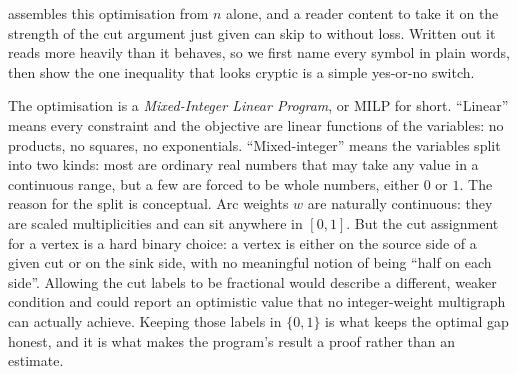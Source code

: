 assembles this optimisation from $n$ alone, and a reader content to take it on the strength of the cut argument just given can skip to  without loss. Written out it reads more heavily than it behaves, so we first name every symbol in plain words, then show the one inequality that looks cryptic is a simple yes-or-no switch.

The optimisation is a \emph{Mixed-Integer Linear Program}, or MILP for short. ``Linear'' means every constraint and the objective are linear functions of the variables: no products, no squares, no exponentials. ``Mixed-integer'' means the variables split into two kinds: most are ordinary real numbers that may take any value in a continuous range, but a few are forced to be whole numbers, either $0$ or $1$. The reason for the split is conceptual. Arc weights $w$ are naturally continuous: they are scaled multiplicities and can sit anywhere in $[0,1]$. But the cut assignment for a vertex is a hard binary choice: a vertex is either on the source side of a given cut or on the sink side, with no meaningful notion of being ``half on each side''. Allowing the cut labels to be fractional would describe a different, weaker condition and could report an optimistic value that no integer-weight multigraph can actually achieve. Keeping those labels in $\{0,1\}$ is what keeps the optimal gap honest, and it is what makes the program's result a proof rather than an estimate.

